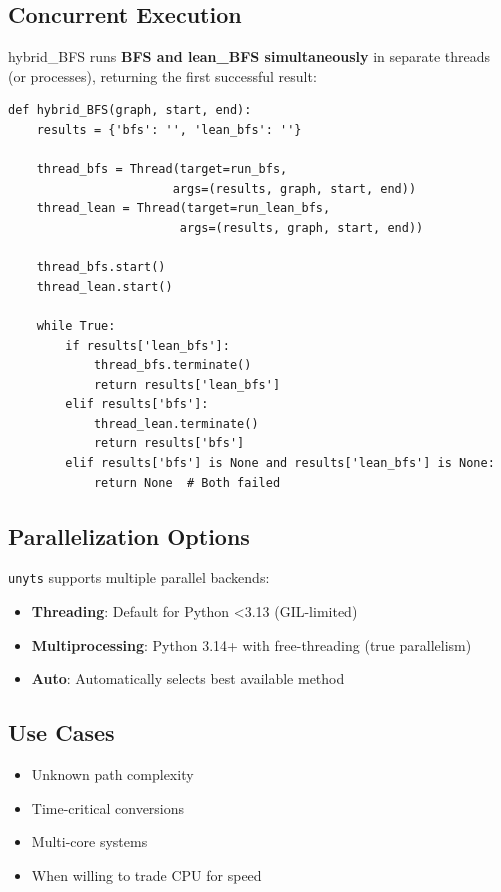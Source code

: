 \documentclass[11pt,a4paper]{report}
\begin{document}
\subsection{Concurrent Execution}

hybrid\_BFS runs \textbf{BFS and lean\_BFS simultaneously} in separate threads (or processes), returning the first successful result:

\begin{lstlisting}[style=pythonstyle, caption={hybrid\_BFS parallel execution}]
def hybrid_BFS(graph, start, end):
    results = {'bfs': '', 'lean_bfs': ''}
    
    thread_bfs = Thread(target=run_bfs, 
                       args=(results, graph, start, end))
    thread_lean = Thread(target=run_lean_bfs, 
                        args=(results, graph, start, end))
    
    thread_bfs.start()
    thread_lean.start()
    
    while True:
        if results['lean_bfs']:
            thread_bfs.terminate()
            return results['lean_bfs']
        elif results['bfs']:
            thread_lean.terminate()
            return results['bfs']
        elif results['bfs'] is None and results['lean_bfs'] is None:
            return None  # Both failed
\end{lstlisting}

\subsection{Parallelization Options}

\texttt{unyts} supports multiple parallel backends:
\begin{itemize}[leftmargin=*]
  \item \textbf{Threading}: Default for Python <3.13 (GIL-limited)
  \item \textbf{Multiprocessing}: Python 3.14+ with free-threading (true parallelism)
  \item \textbf{Auto}: Automatically selects best available method
\end{itemize}

\subsection{Use Cases}

\begin{itemize}[leftmargin=*]
  \item Unknown path complexity
  \item Time-critical conversions
  \item Multi-core systems
  \item When willing to trade CPU for speed
\end{itemize}
\end{document}
